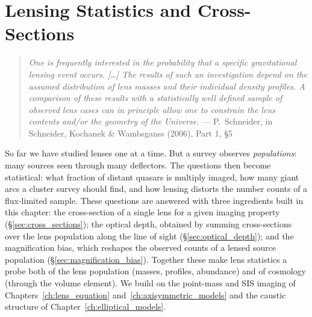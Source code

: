 
\chapter{Lensing Statistics and Cross-Sections}
\label{ch:lensing_statistics}

\begin{quote}
\textit{One is frequently interested in the probability that a specific
gravitational lensing event occurs. [\ldots] The results of such an
investigation depend on the assumed distribution of lens masses and
their individual density profiles.  A comparison of these results with a
statistically well defined sample of observed lens cases can in principle
allow one to constrain the lens contents and/or the geometry of the
Universe.}
\hfill --- P.~Schneider, in Schneider, Kochanek \& Wambsganss (2006), Part 1, \S5
\end{quote}

\noindent
So far we have studied lenses one at a time.  But a survey observes
\emph{populations}: many sources seen through many deflectors.  The
questions then become statistical: what fraction of distant quasars is
multiply imaged, how many giant arcs a cluster survey should find, and
how lensing distorts the number counts of a flux-limited sample.  These
questions are answered with three ingredients built in this chapter:
the cross-section of a single lens for a given imaging property
(\S\ref{sec:cross_sections}); the optical depth, obtained by summing
cross-sections over the lens population along the line of sight
(\S\ref{sec:optical_depth}); and the magnification bias, which
reshapes the observed counts of a lensed source population
(\S\ref{sec:magnification_bias}).
Together these make lens statistics a probe both of the lens population
(masses, profiles, abundance) and of cosmology (through the volume
element).  We build on the point-mass and SIS imaging of
Chapters~\ref{ch:lens_equation} and~\ref{ch:axisymmetric_models} and the
caustic structure of Chapter~\ref{ch:elliptical_models}.

